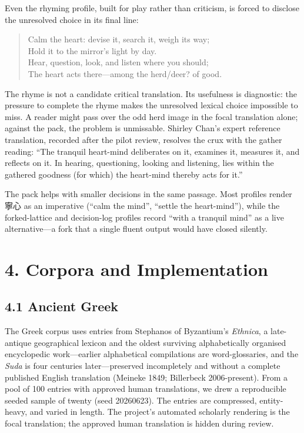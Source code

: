 \documentclass[
  12pt,
]{article}
\begin{document}
Even the rhyming profile, built for play rather than criticism, is
forced to disclose the unresolved choice in its final line:

\begin{quote}
Calm the heart: devise it, search it, weigh its way;\\
Hold it to the mirror's light by day.\\
Hear, question, look, and listen where you should;\\
The heart acts there---among the herd/deer? of good.
\end{quote}

The rhyme is not a candidate critical translation. Its usefulness is
diagnostic: the pressure to complete the rhyme makes the unresolved
lexical choice impossible to miss. A reader might pass over the odd
herd image in the focal translation alone; against the pack, the
problem is unmissable. Shirley Chan's expert reference translation,
recorded after the pilot review, resolves the crux with the gather
reading: ``The tranquil heart-mind deliberates on it, examines it,
measures it, and reflects on it. In hearing, questioning, looking and
listening, lies within the gathered goodness (for which) the heart-mind
thereby acts for it.''

The pack helps with smaller decisions in the same passage. Most
profiles render 寧心 as an imperative (``calm the mind'', ``settle the
heart-mind''), while the forked-lattice and decision-log profiles
record ``with a tranquil mind'' as a live alternative---a fork that a
single fluent output would have closed silently.

\section{4. Corpora and
Implementation}\label{corpora-and-implementation}

\subsection{4.1 Ancient Greek}\label{ancient-greek}

The Greek corpus uses entries from Stephanos of Byzantium's
\emph{Ethnica}, a late-antique geographical lexicon and the oldest
surviving alphabetically organised encyclopedic work---earlier
alphabetical compilations are word-glossaries, and the \emph{Suda} is
four centuries later---preserved incompletely and without a complete
published English translation
(Meineke 1849; Billerbeck 2006-present). From a pool of 100 entries with
approved human translations, we drew a reproducible seeded sample of
twenty (seed 20260623). The entries are compressed, entity-heavy, and
varied in length. The project's automated scholarly rendering is the
focal translation; the approved human translation is hidden during
review.
\end{document}
